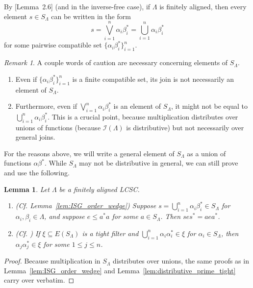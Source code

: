 \documentclass[12pt]{amsart}
\newtheorem{lemma}[thm]{Lemma}
\theoremstyle{definition}
\theoremstyle{remark}
\newtheorem{remark}[thm]{Remark}
\numberwithin{equation}{section}
\renewcommand{\L}{\Lambda}
\renewcommand{\a}{\alpha}
\renewcommand{\b}{\beta}
\newcommand{\I}{\mathcal{I}}
\begin{document}
		 By \cite{OP20}[Lemma~2.6] (and \cite[Lemma~3.3]{Sp14} in the inverse-free case), if $\L$ is finitely aligned, then every element $s\in S_\L$ can be written in the form
		 \begin{equation}\label{eq:S_Lam_form}
		 s = \bigvee_{i=1}^{n}\a_i\b_i^* = \bigcup_{i=1}^{n}\a_i\b_i^*
		 \end{equation}
		 for some pairwise compatible set $\{\a_i\b_i^*\}_{i=1}^n$. 
		 \begin{remark}
		 	A couple words of caution are necessary concerning elements of $S_\L$. 
		 	\begin{enumerate}
		 		\item Even if $\{\a_i\b_i^*\}_{i=1}^n$ is a finite compatible set, its join is not necessarily an element of $S_\L$. 
		 		\item Furthermore, even if $\bigvee_{i=1}^n\a_i\b_i^*$ is an element of $S_\L$, it might not be equal to $\bigcup_{i=1}^n\a_i\b_i^*$. This is a crucial point, because multiplication distributes over unions of functions (because $\I(\L)$ is distributive) but not necessarily over general joins. 
		 	\end{enumerate}
		 	
		 	
		 	
		 	
		 \end{remark}
		 For the reasons above, we will write a general element of $S_\L$ as a union of functions $\a\b^*$. While $S_\L$ may not be distributive in general, we can still prove and use the following.
		 
		 \begin{lemma}\label{lem:LCSC_dist_ish}
		 	Let $\L$ be a finitely aligned LCSC. 
		 	\begin{enumerate}
		 		\item (Cf. Lemma~\ref{lem:ISG_order_wedge}) Suppose $s = \bigcup_{i=1}^n\a_i\b_i^*\in S_\L$ for $\a_i, \b_i\in\L$, and suppose $e\leqslant a^*a$ for some $a\in S_\L$. Then $ses^* = aea^*$.  
		 		\item (Cf. \cite[Lemma~3.1]{OP20}) If $\xi\subseteq E(S_\L)$ is a tight filter and $\bigcup_{i=1}^n\a_i\a_i^*\in \xi$ for $\a_i\in S_\L$, then $\a_j\a_j^*\in \xi$ for some $1\leq j\leq n$. 
		 	\end{enumerate}
		 \end{lemma}
		 \begin{proof}
		 	 Because multiplication in $S_\L$ distributes over unions, the same proofs as in Lemma~\ref{lem:ISG_order_wedge} and Lemma~\ref{lem:distributive_prime_tight} carry over verbatim. 	 	
		 \end{proof}
		 
\end{document}
